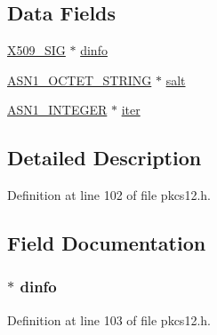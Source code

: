 \subsection*{Data Fields}
\begin{DoxyCompactItemize}
\item 
\hyperlink{crypto_2x509_2x509_8h_a84b39cf74cc1ae6512f7d4481f5f4404}{X509\+\_\+\+S\+IG} $\ast$ \hyperlink{struct_p_k_c_s12___m_a_c___d_a_t_a_a91c99b0aebbe5b8a85363faf8656b592}{dinfo}
\item 
\hyperlink{crypto_2ossl__typ_8h_afbd05e94e0f0430a2b729473efec88c1}{A\+S\+N1\+\_\+\+O\+C\+T\+E\+T\+\_\+\+S\+T\+R\+I\+NG} $\ast$ \hyperlink{struct_p_k_c_s12___m_a_c___d_a_t_a_aaebd8a6f08ab440b05bacfa9bd8af07f}{salt}
\item 
\hyperlink{crypto_2ossl__typ_8h_af4335399bf9774cb410a5e93de65998b}{A\+S\+N1\+\_\+\+I\+N\+T\+E\+G\+ER} $\ast$ \hyperlink{struct_p_k_c_s12___m_a_c___d_a_t_a_ab7b90cf95e75c0cd6742cfe1aad7dd03}{iter}
\end{DoxyCompactItemize}


\subsection{Detailed Description}


Definition at line 102 of file pkcs12.\+h.



\subsection{Field Documentation}
\subsubsection[{\texorpdfstring{dinfo}{dinfo}}]{ $\ast$ dinfo}\hypertarget{struct_p_k_c_s12___m_a_c___d_a_t_a_a91c99b0aebbe5b8a85363faf8656b592}{}\label{struct_p_k_c_s12___m_a_c___d_a_t_a_a91c99b0aebbe5b8a85363faf8656b592}


Definition at line 103 of file pkcs12.\+h.


